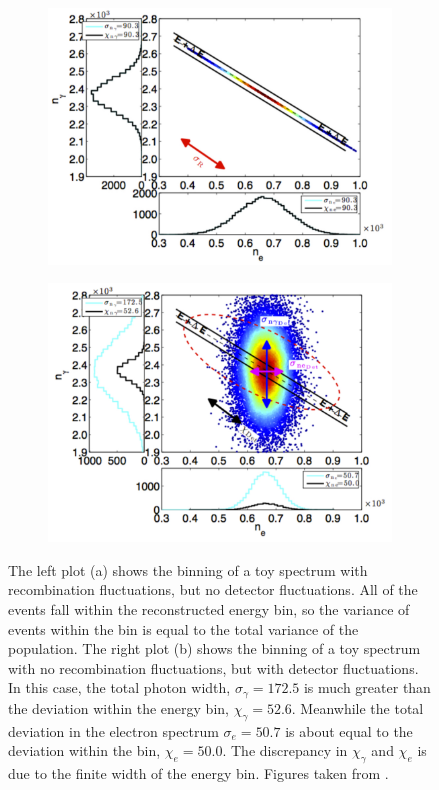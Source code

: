 \begin{figure}[h!]
\centering
\begin{subfigure}{0.5\textwidth}
  \centering
  \includegraphics[width=\textwidth]{Figures/Attila_chi_reconly.pdf}
  \caption{}
\end{subfigure}%
\begin{subfigure}{0.5\textwidth}
  \centering
  \includegraphics[width=\textwidth]{Figures/Attila_chi_norec.pdf}
  \caption{}
\end{subfigure}
\caption{The left plot (a) shows the binning of a toy spectrum with recombination fluctuations, but no detector fluctuations. All of the events fall within the reconstructed energy bin, so the variance of events within the bin is equal to the total variance of the population. The right plot (b) shows the binning of a toy spectrum with no recombination fluctuations, but with detector fluctuations. In this case, the total photon width, $\sigma_{\gamma}=172.5$ is much greater than the deviation within the energy bin, $\chi_{\gamma}=52.6$. Meanwhile the total deviation in the electron spectrum $\sigma_{e}=50.7$ is about equal to the deviation within the bin, $\chi_e=50.0$. The discrepancy in $\chi_{\gamma}$ and $\chi_e$ is due to the finite width of the energy bin. Figures taken from \cite{attila}.}
\label{fig:attila_chi}
\end{figure}
